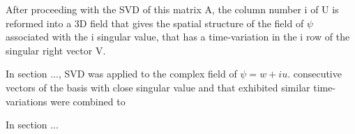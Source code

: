 After proceeding with the SVD of this matrix A, the column number i of U is reformed into a 3D field that gives the spatial structure of the field of $\psi$ associated with the i singular value, that has a time-variation in the i row of the singular right vector V.

In section ..., SVD was applied to the complex field of $\psi=w+iu$. consecutive vectors of the basis with close singular value and that exhibited similar time-variations were combined to 

In section ...
